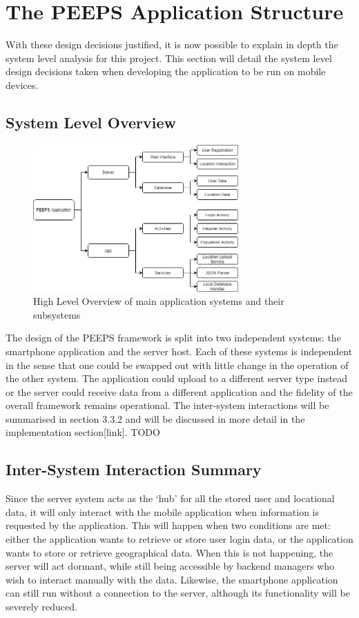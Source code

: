 \section{The PEEPS Application Structure}
With these design decisions justified, it is now possible to explain in depth the system level analysis for this project. This section will detail the system level design decisions taken when developing the application to be run on mobile devices.
\subsection{System Level Overview}

\begin{figure}[ht]
\centering
\includegraphics[width=0.7\textwidth]{figures/SystemHighLevel.png}
\caption{High Level Overview of main application systems and their subsystems}
\label{fig:system_high_level}
\end{figure}

The design of the PEEPS framework is split into two independent systems: the smartphone application and the server host. Each of these systems is independent in the sense that one could be swapped out with little change in the operation of the other system. The application could upload to a different server type instead or the server could receive data from a different application and the fidelity of the overall framework remains operational. The inter-system interactions will be summarised in section 3.3.2 and will be discussed in more detail in the implementation section[link]. TODO

\subsection{Inter-System Interaction Summary}
Since the server system acts as the ‘hub’ for all the stored user and locational data, it will only interact with the mobile application when information is requested by the application. This will happen when two conditions are met: either the application wants to retrieve or store user login data, or the application wants to store or retrieve geographical data. When this is not happening, the server will act dormant, while still being accessible by backend managers who wish to interact manually with the data. Likewise, the smartphone application can still run without a connection to the server, although its functionality will be severely reduced. 

